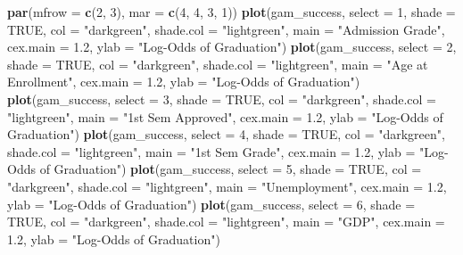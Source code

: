 \documentclass[
]{article}
\newenvironment{Shaded}{\begin{snugshade}}{\end{snugshade}}
\newcommand{\AttributeTok}[1]{\textcolor[rgb]{0.13,0.29,0.53}{#1}}
\newcommand{\ConstantTok}[1]{\textcolor[rgb]{0.56,0.35,0.01}{#1}}
\newcommand{\DecValTok}[1]{\textcolor[rgb]{0.00,0.00,0.81}{#1}}
\newcommand{\FloatTok}[1]{\textcolor[rgb]{0.00,0.00,0.81}{#1}}
\newcommand{\FunctionTok}[1]{\textcolor[rgb]{0.13,0.29,0.53}{\textbf{#1}}}
\newcommand{\NormalTok}[1]{#1}
\newcommand{\StringTok}[1]{\textcolor[rgb]{0.31,0.60,0.02}{#1}}
\begin{document}
\begin{Shaded}
\begin{Highlighting}[]
\FunctionTok{par}\NormalTok{(}\AttributeTok{mfrow =} \FunctionTok{c}\NormalTok{(}\DecValTok{2}\NormalTok{, }\DecValTok{3}\NormalTok{), }\AttributeTok{mar =} \FunctionTok{c}\NormalTok{(}\DecValTok{4}\NormalTok{, }\DecValTok{4}\NormalTok{, }\DecValTok{3}\NormalTok{, }\DecValTok{1}\NormalTok{))}
\FunctionTok{plot}\NormalTok{(gam\_success, }\AttributeTok{select =} \DecValTok{1}\NormalTok{, }\AttributeTok{shade =} \ConstantTok{TRUE}\NormalTok{, }\AttributeTok{col =} \StringTok{"darkgreen"}\NormalTok{, }\AttributeTok{shade.col =} \StringTok{"lightgreen"}\NormalTok{,}
     \AttributeTok{main =} \StringTok{"Admission Grade"}\NormalTok{, }\AttributeTok{cex.main =} \FloatTok{1.2}\NormalTok{, }\AttributeTok{ylab =} \StringTok{"Log{-}Odds of Graduation"}\NormalTok{)}
\FunctionTok{plot}\NormalTok{(gam\_success, }\AttributeTok{select =} \DecValTok{2}\NormalTok{, }\AttributeTok{shade =} \ConstantTok{TRUE}\NormalTok{, }\AttributeTok{col =} \StringTok{"darkgreen"}\NormalTok{, }\AttributeTok{shade.col =} \StringTok{"lightgreen"}\NormalTok{,}
     \AttributeTok{main =} \StringTok{"Age at Enrollment"}\NormalTok{, }\AttributeTok{cex.main =} \FloatTok{1.2}\NormalTok{, }\AttributeTok{ylab =} \StringTok{"Log{-}Odds of Graduation"}\NormalTok{)}
\FunctionTok{plot}\NormalTok{(gam\_success, }\AttributeTok{select =} \DecValTok{3}\NormalTok{, }\AttributeTok{shade =} \ConstantTok{TRUE}\NormalTok{, }\AttributeTok{col =} \StringTok{"darkgreen"}\NormalTok{, }\AttributeTok{shade.col =} \StringTok{"lightgreen"}\NormalTok{,}
     \AttributeTok{main =} \StringTok{"1st Sem Approved"}\NormalTok{, }\AttributeTok{cex.main =} \FloatTok{1.2}\NormalTok{, }\AttributeTok{ylab =} \StringTok{"Log{-}Odds of Graduation"}\NormalTok{)}
\FunctionTok{plot}\NormalTok{(gam\_success, }\AttributeTok{select =} \DecValTok{4}\NormalTok{, }\AttributeTok{shade =} \ConstantTok{TRUE}\NormalTok{, }\AttributeTok{col =} \StringTok{"darkgreen"}\NormalTok{, }\AttributeTok{shade.col =} \StringTok{"lightgreen"}\NormalTok{,}
     \AttributeTok{main =} \StringTok{"1st Sem Grade"}\NormalTok{, }\AttributeTok{cex.main =} \FloatTok{1.2}\NormalTok{, }\AttributeTok{ylab =} \StringTok{"Log{-}Odds of Graduation"}\NormalTok{)}
\FunctionTok{plot}\NormalTok{(gam\_success, }\AttributeTok{select =} \DecValTok{5}\NormalTok{, }\AttributeTok{shade =} \ConstantTok{TRUE}\NormalTok{, }\AttributeTok{col =} \StringTok{"darkgreen"}\NormalTok{, }\AttributeTok{shade.col =} \StringTok{"lightgreen"}\NormalTok{,}
     \AttributeTok{main =} \StringTok{"Unemployment"}\NormalTok{, }\AttributeTok{cex.main =} \FloatTok{1.2}\NormalTok{, }\AttributeTok{ylab =} \StringTok{"Log{-}Odds of Graduation"}\NormalTok{)}
\FunctionTok{plot}\NormalTok{(gam\_success, }\AttributeTok{select =} \DecValTok{6}\NormalTok{, }\AttributeTok{shade =} \ConstantTok{TRUE}\NormalTok{, }\AttributeTok{col =} \StringTok{"darkgreen"}\NormalTok{, }\AttributeTok{shade.col =} \StringTok{"lightgreen"}\NormalTok{,}
     \AttributeTok{main =} \StringTok{"GDP"}\NormalTok{, }\AttributeTok{cex.main =} \FloatTok{1.2}\NormalTok{, }\AttributeTok{ylab =} \StringTok{"Log{-}Odds of Graduation"}\NormalTok{)}
\end{Highlighting}
\end{Shaded}
\end{document}
